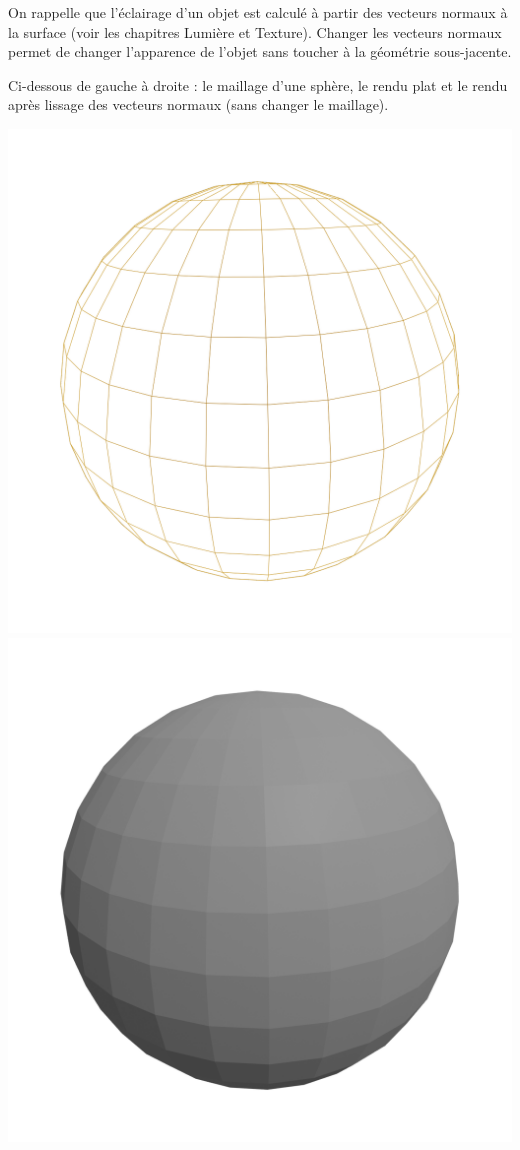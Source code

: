 \documentclass[11pt,class=report,crop=false]{standalone}
\begin{document}
On rappelle que l'éclairage d'un objet est calculé à partir des vecteurs normaux à la surface (voir les chapitres \og{}Lumière\fg{} et \og{}Texture\fg{}). Changer les vecteurs normaux permet de changer l'apparence de l'objet sans toucher à la géométrie sous-jacente.

Ci-dessous de gauche à droite : le maillage d'une sphère, le rendu plat et le rendu après lissage des vecteurs normaux (sans changer le maillage).
\begin{center}
	\includegraphics[scale=\myscale,scale=0.15,trim={2cm 0 2cm 0},clip,]{figures/sphere-new-00}
	\includegraphics[scale=\myscale,scale=0.15,trim={2cm 0 2cm 0},clip,]{figures/sphere-new-02}		

\end{center}
\end{document}

